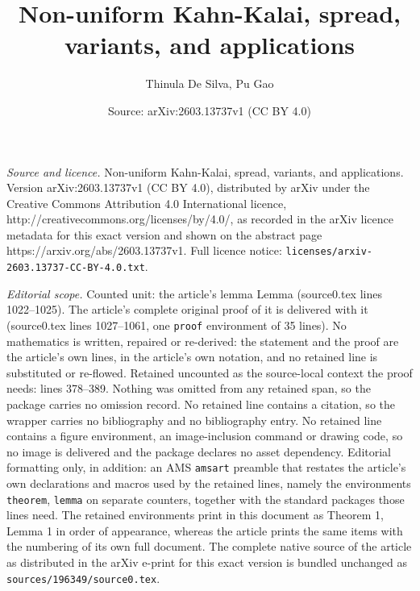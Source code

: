 \documentclass[10pt,a4paper]{amsart}
\title{Non-uniform Kahn-Kalai, spread, variants, and applications}
\author{Thinula De Silva, Pu Gao}
\date{Source: arXiv:2603.13737v1 (CC BY 4.0)}
\begin{document}
\maketitle

\noindent\emph{Source and licence.} Non-uniform Kahn-Kalai, spread, variants, and applications. Version arXiv:2603.13737v1 (CC BY 4.0), distributed by arXiv under the Creative Commons Attribution 4.0 International licence, http://creativecommons.org/licenses/by/4.0/, as recorded in the arXiv licence metadata for this exact version and shown on the abstract page https://arxiv.org/abs/2603.13737v1. Full licence notice: \texttt{licenses/arxiv-2603.13737-CC-BY-4.0.txt}.\par\smallskip

\noindent\textit{Editorial scope.} Counted unit: the article's lemma Lemma (source0.tex lines 1022--1025). The article's complete original proof of it is delivered with it (source0.tex lines 1027--1061, one \texttt{proof} environment of 35 lines). No mathematics is written, repaired or re-derived: the statement and the proof are the article's own lines, in the article's own notation, and no retained line is substituted or re-flowed.  Retained uncounted as the source-local context the proof needs: lines 378--389.  Nothing was omitted from any retained span, so the package carries no omission record.  No retained line contains a citation, so the wrapper carries no bibliography and no bibliography entry.  No retained line contains a figure environment, an image-inclusion command or drawing code, so no image is delivered and the package declares no asset dependency.  Editorial formatting only, in addition: an AMS \texttt{amsart} preamble that restates the article's own declarations and macros used by the retained lines, namely the environments \texttt{theorem}, \texttt{lemma} on separate counters, together with the standard packages those lines need.  The retained environments print in this document as Theorem 1, Lemma 1 in order of appearance, whereas the article prints the same items with the numbering of its own full document.  The complete native source of the article as distributed in the arXiv e-print for this exact version is bundled unchanged as \texttt{sources/196349/source0.tex}.
\end{document}
